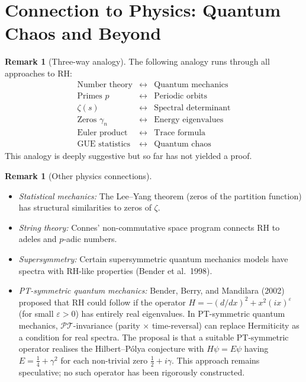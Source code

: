 \documentclass[12pt,a4paper]{amsart}
\theoremstyle{definition}
\newtheorem{remark}[theorem]{Remark}
\begin{document}
\section{Connection to Physics: Quantum Chaos and Beyond}

\begin{remark}[Three-way analogy]
The following analogy runs through all approaches to RH:
\[
\begin{array}{ccc}
  \text{Number theory} & \longleftrightarrow & \text{Quantum mechanics} \\
  \hline
  \text{Primes } p & \longleftrightarrow & \text{Periodic orbits} \\
  \zeta(s) & \longleftrightarrow & \text{Spectral determinant} \\
  \text{Zeros } \gamma_n & \longleftrightarrow & \text{Energy eigenvalues} \\
  \text{Euler product} & \longleftrightarrow & \text{Trace formula} \\
  \text{GUE statistics} & \longleftrightarrow & \text{Quantum chaos}
\end{array}
\]
This analogy is deeply suggestive but so far has not yielded a proof.
\end{remark}

\begin{remark}[Other physics connections]
\begin{itemize}
  \item \textit{Statistical mechanics:} The Lee--Yang theorem (zeros of
    the partition function) has structural similarities to zeros of $\zeta$.
  \item \textit{String theory:} Connes' non-commutative space program
    connects RH to adeles and $p$-adic numbers.
  \item \textit{Supersymmetry:} Certain supersymmetric quantum mechanics
    models have spectra with RH-like properties (Bender et al.\ 1998).
  \item \textit{PT-symmetric quantum mechanics:} Bender, Berry, and Mandilara (2002)
    proposed that RH could follow if the operator
    $H = -(d/dx)^2 + x^2(ix)^\varepsilon$ (for small $\varepsilon > 0$)
    has entirely real eigenvalues.  In PT-symmetric quantum mechanics,
    $\mathcal{PT}$-invariance (parity $\times$ time-reversal) can replace
    Hermiticity as a condition for real spectra.  The proposal is that a
    suitable PT-symmetric operator realises the Hilbert--P\'olya conjecture
    with $H\psi = E\psi$ having $E = \tfrac{1}{4} + \gamma^2$ for each
    non-trivial zero $\tfrac{1}{2} + i\gamma$.  This approach remains
    speculative; no such operator has been rigorously constructed.
\end{itemize}
\end{remark}
\end{document}

